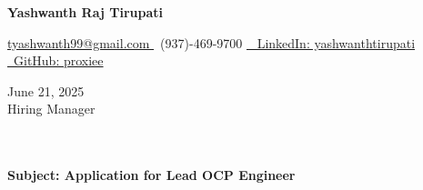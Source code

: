 \documentclass[letterpaper,11pt]{article}
\begin{document}
\begin{center}
    \textbf{\LARGE Yashwanth Raj Tirupati}
    \vspace{4pt}
    
    \small
    \href{mailto:tyashwanth99@gmail.com}{ tyashwanth99@gmail.com }\textbar
     ~(937)-469-9700 \textbar
    \href{https://linkedin.com/in/yashwanthtirupati}{~ LinkedIn: yashwanthtirupati }\textbar 
    \href{https://github.com/proxiee}{~GitHub: proxiee }
\end{center}

\vspace{20pt}

\begin{flushleft}
    June 21, 2025 \\
    \vspace{12pt}
    Hiring Manager \\
    [Company Name] \\
    [Location] \\
\end{flushleft}


\begin{flushleft}
\textbf{Subject: Application for Lead OCP Engineer}
\end{flushleft}


\end{document}
